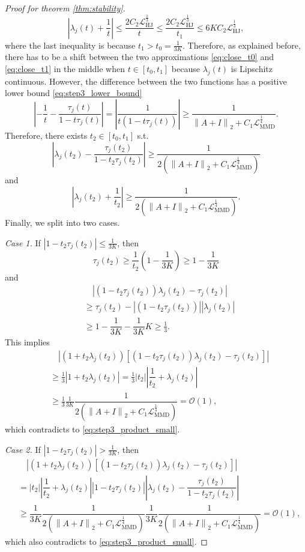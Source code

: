 \documentclass{article} %
\theoremstyle{plain}
\theoremstyle{definition}
\theoremstyle{remark}
\newcommand{\cO}{\mathcal{O}}
\newcommand{\norm}[2][H^s]{\left\|#2\right\|_{#1}}
\newcommand{\LMMD}{\mathcal{L}_{\text{MMD}}}
\newcommand{\LHJ}{\mathcal{L}_{\text{HJ}}}
\newcommand{\lam}{\lambda}
\newcommand{\parentheses}[1]{\left(#1\right)}
\newcommand{\sqbra}[1]{\left[#1\right]}
\newcommand{\abs}[1]{\left|#1\right|}
\begin{document}
\begin{proof}[Proof for theorem \ref{thm:stability}]
\begin{equation}
\abs{\lam_j(t) + \dfrac{1}{t} } \le \dfrac{2 C_2 \LHJ^{\frac13}}{t} \le \dfrac{2 C_2 \LHJ^{\frac13}}{t_1} \le 6K C_2 \LHJ^{\frac13},
\end{equation}
where the last inequality is because $t_1 > t_0 = \frac{1}{3K}$. Therefore, as explained before, there has to be a shift between the two approximations \eqref{eq:close_t0} and \eqref{eq:close_t1} in the middle when $t \in [t_0,t_1]$ because $\lam_j(t)$ is Lipschitz continuous. However, the difference between the two functions has a positive lower bound \eqref{eq:step3_lower_bound}
$$\abs{-\dfrac{1}{t} - \dfrac{\tau_j(t)}{1-t \tau_j(t)}} = \abs{\dfrac{1}{t(1 - t \tau_j(t))}} \ge \dfrac{1}{\norm[2]{A+I} + C_1 \LMMD^{\frac14}}.$$
Therefore, there exists $t_2 \in [t_0,t_1]$ s.t.
\begin{equation}\label{eq:lower1}
\abs{\lam_j(t_2) - \dfrac{\tau_j(t_2)}{1 - t_2 \tau_j(t_2)}} \ge \dfrac{1}{2\parentheses{\norm[2]{A+I} + C_1 \LMMD^{\frac14}}}
\end{equation}
and
\begin{equation}\label{eq:lower2}
\abs{\lam_j(t_2) + \dfrac{1}{t_2} } \ge \dfrac{1}{2\parentheses{\norm[2]{A+I} + C_1 \LMMD^{\frac14}}}.
\end{equation}
Finally, we split into two cases.

\noindent \emph{Case 1.} If $|1-t_2\tau_j(t_2)| \le \frac{1}{3K}$, then
$$\tau_j(t_2) \ge \frac{1}{t_2} \parentheses{1-\dfrac{1}{3K}} \ge 1 - \dfrac{1}{3K}$$
and
\begin{align*}
& \quad \abs{(1-t_2\tau_j(t_2))\lam_j(t_2) - \tau_j(t_2)} \\
& \ge \tau_j(t_2) - \abs{(1-t_2\tau_j(t_2))} \abs{\lam_j(t_2)} \\
& \ge 1 - \dfrac{1}{3K} - \dfrac{1}{3K} K \ge \frac13.
\end{align*}
This implies
\begin{align*}
& \quad \abs{ \parentheses{1+ t_2\lam_j(t_2)}\sqbra{(1-t_2\tau_j(t_2))\lam_j(t_2) - \tau_j(t_2)}} \\
& \ge \frac13 \abs{1+ t_2\lam_j(t_2)} = \frac13 |t_2| \abs{\dfrac{1}{t_2} + \lam_j(t_2)} \\
& \ge \frac13 \frac{1}{3K} \dfrac{1}{2\parentheses{\norm[2]{A+I} + C_1 \LMMD^{\frac14}}} = \cO(1),
\end{align*}
which contradicts to \eqref{eq:step3_product_small}.

\noindent \emph{Case 2.} If $|1-t_2\tau_j(t_2)| > \frac{1}{3K}$, then 
\begin{align*}
& \quad \abs{ \parentheses{1+ t_2\lam_j(t_2)}\sqbra{(1-t_2\tau_j(t_2))\lam_j(t_2) - \tau_j(t_2)}} \\
& =  |t_2| \abs{\dfrac{1}{t_2} + \lam_j(t_2)} \abs{1-t_2\tau_j(t_2)} \abs{\lam_j(t_2) - \dfrac{\tau_j(t_2)}{1 - t_2 \tau_j(t_2)}} \\
& \ge \dfrac{1}{3K} \dfrac{1}{2\parentheses{\norm[2]{A+I} + C_1 \LMMD^{\frac14}}} \dfrac{1}{3K} \dfrac{1}{2\parentheses{\norm[2]{A+I} + C_1 \LMMD^{\frac14}}} = \cO(1),
\end{align*}
which also contradicts to \eqref{eq:step3_product_small}.


\end{proof}
\end{document}
